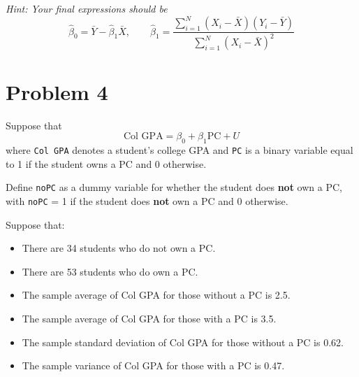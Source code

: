 \documentclass[11pt]{article}
\begin{document}
\textit{Hint: Your final expressions should be}
\[
\hat{\beta}_0 = \bar{Y} - \hat{\beta}_1 \bar{X}, \qquad \hat{\beta}_1 = \frac{\sum_{i=1}^N (X_i - \bar{X})(Y_i - \bar{Y})}{\sum_{i=1}^N (X_i - \bar{X})^2}
\]

\newpage
\section*{Problem 4}

Suppose that
\[
\text{Col GPA} = \beta_0 + \beta_1 \text{PC} + U
\]
where \texttt{Col GPA} denotes a student’s college GPA and \texttt{PC} is a binary variable equal to 1 if the student owns a PC and 0 otherwise.

Define \texttt{noPC} as a dummy variable for whether the student does \textbf{not} own a PC, with \texttt{noPC} = 1 if the student does \textbf{not} own a PC and 0 otherwise.

Suppose that:
\begin{itemize}
    \item There are 34 students who do not own a PC.
    \item There are 53 students who do own a PC.
    \item The sample average of Col GPA for those without a PC is 2.5.
    \item The sample average of Col GPA for those with a PC is 3.5.
    \item The sample standard deviation of Col GPA for those without a PC is 0.62.
    \item The sample variance of Col GPA for those with a PC is 0.47.
\end{itemize}
\end{document}
